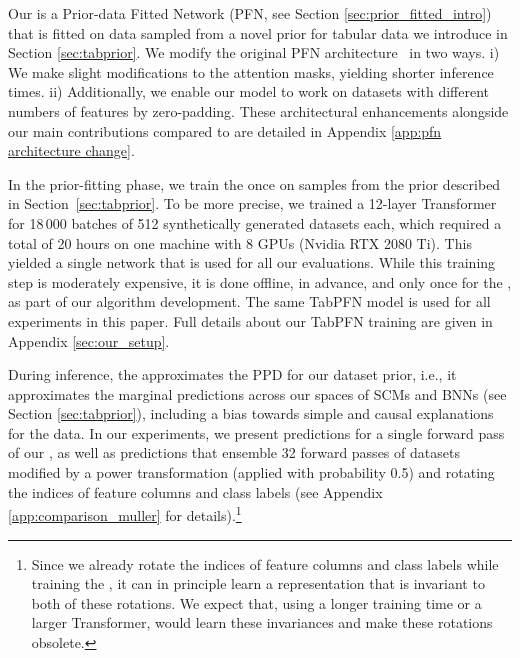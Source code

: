 \documentclass{article}
\begin{document}
Our \methodname{} is a Prior-data Fitted Network (PFN, see Section \ref{sec:prior_fitted_intro}) that is fitted on data sampled from a novel prior for tabular data we introduce in Section \ref{sec:tabprior}. 
We modify the original PFN architecture~\citep{muller-iclr22a} in two ways.
i) We make slight modifications to the attention masks, yielding shorter inference times.
ii) Additionally, we enable our model to work on datasets with different numbers of features by zero-padding.
These architectural enhancements alongside our main contributions compared to \cite{muller-iclr22a} are detailed in Appendix \ref{app:pfn architecture change}.

In the prior-fitting phase, we train the \methodname{} once on samples from the prior described in Section~\ref{sec:tabprior}. To be more precise, we trained a 12-layer Transformer for 18\,000 batches of 512 synthetically generated datasets each, which required a total of 20 hours on one machine with 8 GPUs (Nvidia RTX 2080 Ti). This yielded a single network that is used for all our evaluations.
While this training step is moderately expensive, it is done offline, in advance, and only once for the \methodname{}, as part of our algorithm development. The same TabPFN model is used for all experiments in this paper. Full details about our TabPFN training are given in Appendix \ref{sec:our_setup}.

During inference, the \methodname{} approximates the PPD for our dataset prior, i.e., it approximates the marginal predictions across our spaces of SCMs and BNNs (see Section \ref{sec:tabprior}), including a bias towards simple and causal explanations for the data.
In our experiments, we present predictions for a single forward pass of our \methodname{}, as well as predictions that ensemble 32 forward passes of datasets modified by a power transformation (applied with probability 0.5) and rotating the indices of feature columns and class labels (see Appendix \ref{app:comparison_muller} for details).\footnote{Since we already rotate the indices of feature columns and class labels while training the \methodname{}, it can in principle learn a representation that is invariant to both of these rotations. We expect that, using a longer training time or a larger Transformer, \methodname{} would learn these invariances and make these rotations obsolete.}
\end{document}
